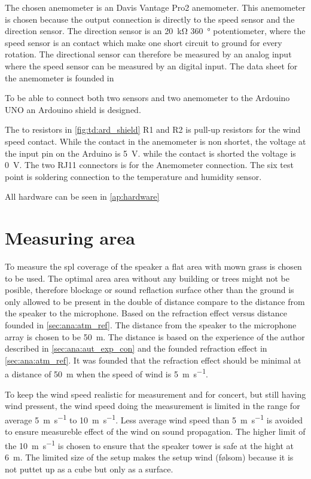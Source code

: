 The chosen anemometer is an Davis Vantage Pro2 anemometer. This anemometer is chosen because the output connection is directly to the speed sensor and the direction sensor. The direction sensor is an \SI{20}{\kilo\ohm} \SI{360}{\degree} potentiometer, where the speed sensor is an contact which make one short circuit to ground for every rotation. The directional sensor can therefore be measured by an analog input where the speed sensor can be measured by an digital input. The data sheet for the anemometer is founded in \citep{anemometer_sens}

To be able to connect both two sensors and two anemometer to the Ardouino UNO an Ardouino shield is designed. 




The to resistors in \autoref{fig:td:ard_shield} R1 and R2 is pull-up resistors for the wind speed contact. While the contact in the anemometer is non shortet, the voltage at the input pin on the Arduino is \SI{5}{\volt}. while the contact is shorted the voltage is \SI{0}{\volt}. The two RJ11 connectors is for the Anemometer connection. The six test point is soldering connection to the temperature and humidity sensor. 

All hardware can be seen in \autoref{ap:hardware}






\section{Measuring area}
To measure the \gls{spl} coverage of the speaker a flat area with mown grass is chosen to be used. The optimal area area without any building or trees might not be posible, therefore blockage or sound reflaction surface other than the ground is only allowed to be present in the double of distance compare to the distance from the speaker to the microphone. Based on the refraction effect versus distance founded in \autoref{sec:ana:atm_ref}. The distance from the speaker to the microphone array is chosen to be \SI{50}{\meter}. The distance is based on the experience of the author described in \autoref{sec:ana:aut_exp_con} and the founded refraction effect in \autoref{sec:ana:atm_ref}. It was founded that the refraction effect should be minimal at a distance of \SI{50}{\meter} when the speed of wind is \SI{5}{\meter\per\second}. 


To keep the wind speed realistic for measurement and for concert, but still having wind pressent, the wind speed doing the measurement is limited in the range for average \SI{5}{\meter\per\second} to \SI{10}{\meter\per\second}. Less average wind speed than \SI{5}{\meter\per\second} is avoided to ensure measureble effect of the wind on sound propagation. The higher limit of the \SI{10}{\meter\per\second} is chosen to ensure that the speaker tower is safe at the hight at \SI{6}{\meter}. The limited size of the setup makes the setup wind (følsom) because it is not puttet up as a cube but only as a surface. 